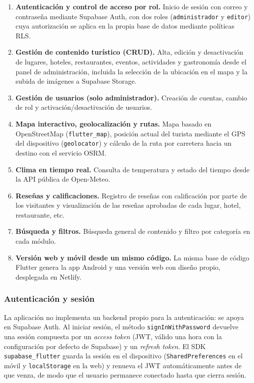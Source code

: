 \begin{enumerate}
  \item \textbf{Autenticación y control de acceso por rol.} Inicio de
  sesión con correo y contraseña mediante Supabase Auth, con dos roles
  (\texttt{administrador} y \texttt{editor}) cuya autorización se aplica
  en la propia base de datos mediante políticas RLS.
  \item \textbf{Gestión de contenido turístico (CRUD).} Alta, edición y
  desactivación de lugares, hoteles, restaurantes, eventos, actividades
  y gastronomía desde el panel de administración, incluida la selección
  de la ubicación en el mapa y la subida de imágenes a Supabase Storage.
  \item \textbf{Gestión de usuarios (solo administrador).} Creación de
  cuentas, cambio de rol y activación/desactivación de usuarios.
  \item \textbf{Mapa interactivo, geolocalización y rutas.} Mapa basado
  en OpenStreetMap (\texttt{flutter\_map}), posición actual del turista
  mediante el GPS del dispositivo (\texttt{geolocator}) y cálculo de la
  ruta por carretera hacia un destino con el servicio OSRM.
  \item \textbf{Clima en tiempo real.} Consulta de temperatura y estado
  del tiempo desde la API pública de Open-Meteo.
  \item \textbf{Reseñas y calificaciones.} Registro de reseñas con
  calificación por parte de los visitantes y visualización de las
  reseñas aprobadas de cada lugar, hotel, restaurante, etc.
  \item \textbf{Búsqueda y filtros.} Búsqueda general de contenido y
  filtro por categoría en cada módulo.
  \item \textbf{Versión web y móvil desde un mismo código.} La misma
  base de código Flutter genera la app Android y una versión web con
  diseño propio, desplegada en Netlify.
\end{enumerate}

\subsubsection*{Autenticación y sesión}

La aplicación no implementa un backend propio para la autenticación: se
apoya en Supabase Auth. Al iniciar sesión, el método
\texttt{signInWithPassword} devuelve una sesión compuesta por un
\emph{access token} (JWT, válido una hora con la configuración por
defecto de Supabase) y un \emph{refresh token}. El SDK
\texttt{supabase\_flutter} guarda la sesión en el dispositivo
(\texttt{SharedPreferences} en el móvil y \texttt{localStorage} en la
web) y renueva el JWT automáticamente antes de que venza, de modo que
el usuario permanece conectado hasta que cierra sesión.

